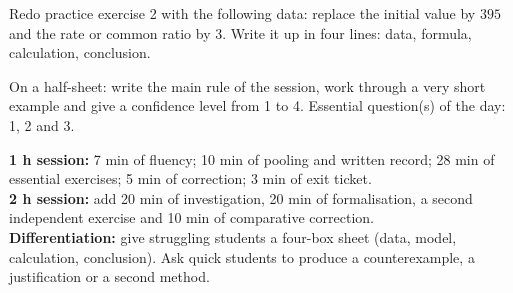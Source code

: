 \begin{dm}Redo practice exercise 2 with the following data: replace the initial value by $395$ and the rate or common ratio by $3$. Write it up in four lines: data, formula, calculation, conclusion.\end{dm}

\begin{sortie}On a half-sheet: write the main rule of the session, work through a very short example and give a confidence level from 1 to 4. Essential question(s) of the day: 1, 2 and 3.\end{sortie}

\ifprof
\begin{methode}
\textbf{1 h session:} 7 min of fluency; 10 min of pooling and written record; 28 min of essential exercises; 5 min of correction; 3 min of exit ticket.\\
\textbf{2 h session:} add 20 min of investigation, 20 min of formalisation, a second independent exercise and 10 min of comparative correction.\\
\textbf{Differentiation:} give struggling students a four-box sheet (data, model, calculation, conclusion). Ask quick students to produce a counterexample, a justification or a second method.
\end{methode}
\fi
